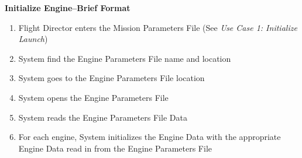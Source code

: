 \documentclass[letterpaper]{article}
\begin{document}
\noindent
\textbf{Initialize Engine--Brief Format}
\begin{enumerate}
   \item Flight Director enters the Mission Parameters File (See 
      \textit{Use Case 1:  Initialize Launch}) 
   \item System find the Engine Parameters File name and location
   \item System goes to the Engine Parameters File location
   \item System opens the Engine Parameters File
   \item System reads the Engine Parameters File Data
   \item For each engine, System initializes the Engine Data with the
      appropriate Engine Data read in from the Engine Parameters File
\end{enumerate}
\end{document}
